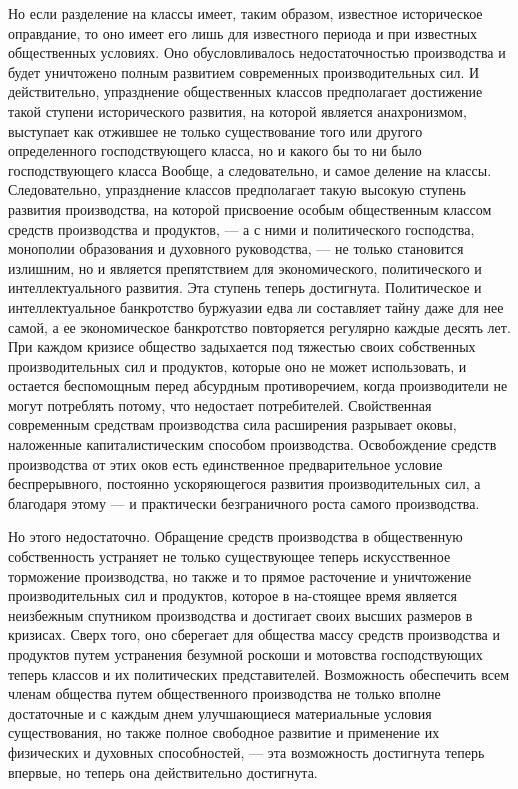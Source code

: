 \documentclass[12pt]{article}
\newcommand{\parnum}{(\arabic{parcount})}
\newcounter{parcount}
\newenvironment{parnumbers}{%
  \par%
  \everypar{\noindent \stepcounter{parcount}\marginpar[]{\parnum}}%
}{}
\begin{document}
\begin{parnumbers}
    Но если разделение на классы имеет, таким образом, известное историческое оправдание, то оно имеет его лишь для известного периода и при известных общественных условиях. Оно обусловливалось недостаточностью производства и будет уничтожено полным развитием современных производительных сил. И действительно, упразднение общественных классов предполагает достижение такой ступени исторического развития, на которой является анахронизмом, выступает как отжившее не только существование того или другого определенного господствующего класса, но и какого бы то ни было господствующего класса Вообще, а следовательно, и самое деление на классы. Следовательно, упразднение классов предполагает такую высокую ступень развития производства, на которой присвоение особым общественным классом средств производства и продуктов, — а с ними и политического господства, монополии образования и духовного руководства, — не только становится излишним, но и является препятствием для экономического, политического и интеллектуального развития. Эта ступень теперь достигнута. Политическое и интеллектуальное банкротство буржуазии едва ли составляет тайну даже для нее самой, а ее экономическое банкротство повторяется регулярно каждые десять лет. При каждом кризисе общество задыхается под тяжестью своих собственных производительных сил и продуктов, которые оно не может использовать, и остается беспомощным перед абсурдным противоречием, когда производители не могут потреблять потому, что недостает потребителей. Свойственная современным средствам производства сила расширения разрывает оковы, наложенные капиталистическим способом производства. Освобождение средств производства от этих оков есть единственное предварительное условие беспрерывного, постоянно ускоряющегося развития производительных сил, а благодаря этому — и практически безграничного роста самого производства.

    Но этого недостаточно. Обращение средств производства в общественную собственность устраняет не только существующее теперь искусственное торможение производства, но также и то прямое расточение и уничтожение производительных сил и продуктов, которое в на-стоящее время является неизбежным спутником производства и достигает своих высших размеров в кризисах. Сверх того, оно сберегает для общества массу средств производства и продуктов путем устранения безумной роскоши и мотовства господствующих теперь классов и их политических представителей. Возможность обеспечить всем членам общества путем общественного производства не только вполне достаточные и с каждым днем улучшающиеся материальные условия существования, но также полное свободное развитие и применение их физических и духовных способностей, — эта возможность достигнута теперь впервые, но теперь она действительно достигнута.


\end{parnumbers}
\end{document}

